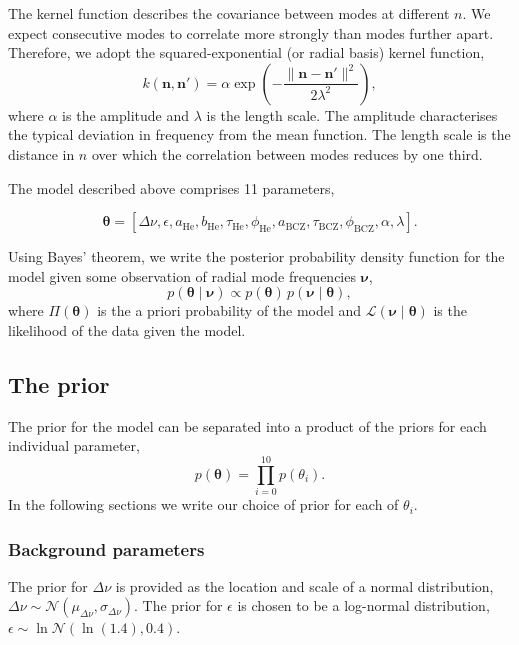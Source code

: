 \documentclass[linenumbers,modern,astrosymb,times]{aastex631}
\newcommand{\helium}{\mathrm{He}}
\newcommand{\bcz}{\mathrm{BCZ}}
\begin{document}
The kernel function describes the covariance between modes at different \(n\).
We expect consecutive modes to correlate more strongly than modes further
apart. Therefore, we adopt the squared-exponential (or radial basis) kernel
function,
%
\begin{equation}
    k(\bm n, \bm n') = \alpha
    \exp\left(- \frac{\| \bm n - \bm n' \|^2}{2\lambda^2}\right),
\end{equation}
%
where \(\alpha\) is the amplitude and \(\lambda\) is the length scale. The
amplitude characterises the typical deviation in frequency from the mean
function. The length scale is the distance in \(n\) over which the correlation
between modes reduces by one third.

The model described above comprises 11 parameters,

\begin{equation}
    \bm\theta = [\Delta\nu, \epsilon, a_\helium, b_\helium, \tau_\helium,
    \phi_\helium, a_\bcz, \tau_\bcz, \phi_\bcz, \alpha, \lambda].
\end{equation}

Using Bayes' theorem, we write the posterior probability density function for
the model given some observation of radial mode frequencies \(\bm\nu\),
%
\begin{equation}
    p(\bm\theta \mid \bm\nu) \propto p(\bm\theta) \,
    p(\bm\nu \mid \bm\theta),
\end{equation}
%
where \(\Pi(\bm\theta)\) is the a priori probability of the model and
\(\mathcal{L}(\bm\nu \mid \bm\theta)\) is the likelihood of the data given the
model.


\subsection{The prior}\label{sec:prior}

The prior for the model can be separated into a product of the priors for each
individual parameter,
%
\begin{equation}
    p(\bm\theta) = \prod_{i=0}^{10} p(\theta_i).
\end{equation}
%
In the following sections we write our choice of prior for each of
\(\theta_i\).


\subsubsection{Background parameters}\label{sec:bkg-params}

The prior for \(\Delta\nu\) is provided as the location and scale of a
normal distribution, \(\Delta\nu \sim \mathcal{N}(\mu_{\Delta\nu},
\sigma_{\Delta\nu})\). The prior for \(\epsilon\) is chosen to be a log-normal
distribution, \(\epsilon \sim \ln\mathcal{N}(\ln(1.4), 0.4)\).
\end{document}
